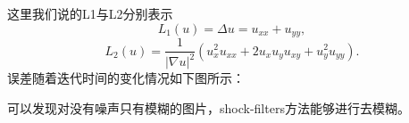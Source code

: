 \documentclass[a4paper,  11pt]{ctexart}
\begin{document}
\begin{figure}[H]
\end{figure}
这里我们说的L1与L2分别表示
\[ L_1(u) = \Delta u =u_{xx}+u_{yy}, \]
\[ L_2(u) = \frac{1}{|\nabla
u|^2}(u_x^2u_{xx}+2u_xu_yu_{xy}+u_y^2u_{yy}). 
\]
误差随着迭代时间的变化情况如下图所示：
\begin{figure}[H]
    \centering
\end{figure}

可以发现对没有噪声只有模糊的图片，shock-filters方法能够进行去模糊。
\end{document}
